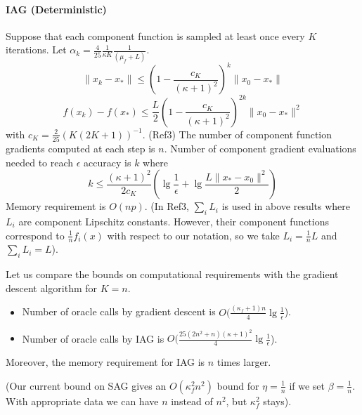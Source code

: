 \documentclass{article}
\begin{document}
 \paragraph{IAG (Deterministic)}  Suppose that each component function is sampled at least once every $K$ iterations.  Let $\alpha_k = \displaystyle\frac{4}{25}\frac{1}{\kappa K}\frac{1}{(\mu_f+L)}$.
 \[
  \|x_k-x_\ast\|\leq \left(1-\frac{c_K}{(\kappa+1)^2}\right)^k \|x_0-x_\ast\|
 \]
\[
 f(x_k)-f(x_\ast) \leq \frac{L}{2}\left(1-\frac{c_K}{(\kappa+1)^2}\right)^{2k} \|x_0-x_\ast\|^2
\]
with $c_K = \frac{2}{25}(K(2K+1))^{-1}$. (Ref3)
The number of component function gradients computed at each step is $n$.  Number of component gradient evaluations needed to reach $\epsilon$ accuracy is $k$ where
\[
 k\leq \frac{(\kappa+1)^2}{2c_K}\left(\lg\frac{1}{\epsilon}+\lg\frac{L\|x_\ast-x_0\|^2}{2}\right)
\]
Memory requirement is $O(np)$. (In Ref3, $\sum_i L_i$ is used in above results where $L_i$ are component Lipschitz constants.  However, their component functions correspond to $\frac{1}{n}f_i(x)$ with respect to our notation, so we take $L_i=\frac{1}{n}L$ and $\sum_i L_i=L$).

Let us compare the bounds on computational requirements with the gradient descent algorithm for $K=n$.
\begin{itemize}
\item Number of oracle calls by gradient descent is $ O(\displaystyle\frac{(\kappa_f+1)n}{4}\lg\frac{1}{\epsilon}$).
\item Number of oracle calls by IAG is $O(\displaystyle\frac{25(2n^2+n)(\kappa+1)^2}{4}\lg\frac{1}{\epsilon}$).
\end{itemize} 
Moreover, the memory requirement for IAG is $n$ times larger. 

 (Our current bound on SAG gives an $O(\kappa_f^2n^2)$ bound for $\eta=\frac{1}{n}$ if we set $\beta=\frac{1}{n}$.  With appropriate data we can have $n$ instead of $n^2$, but $\kappa_f^2$ stays).
 
\end{document}

